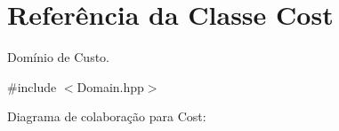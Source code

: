 \hypertarget{classCost}{}\section{Referência da Classe Cost}
\label{classCost}


Domínio de Custo.  




{\ttfamily \#include $<$Domain.\+hpp$>$}



Diagrama de colaboração para Cost\+:
